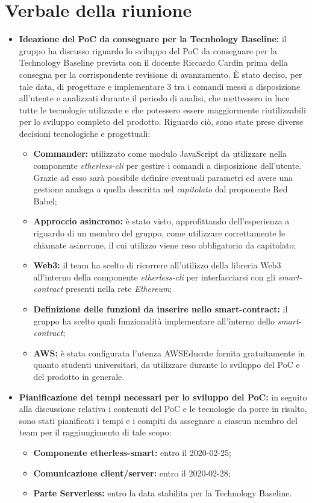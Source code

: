 \section{Verbale della riunione}
	\begin{itemize}
		\item \textbf{Ideazione del PoC da consegnare per la Tecnhology Baseline:} il gruppo ha discusso riguardo lo sviluppo del PoC da consegnare per la Technology Baseline prevista con il docente Riccardo Cardin prima della consegna per la corrispondente revisione di avanzamento. È stato deciso, per tale data, di progettare e implementare 3 tra i comandi messi a disposizione all'utente e analizzati durante il periodo di analisi, che mettessero in luce tutte le tecnologie utilizzate e che potessero essere maggiormente riutilizzabili per lo sviluppo completo del prodotto. Riguardo ciò, sono state prese diverse decisioni tecnologiche e progettuali:
		\begin{itemize}
			\item \textbf{Commander:} utilizzato come modulo JavaScript da utilizzare nella componente \textit{etherless-cli} per gestire i comandi a disposizione dell'utente. Grazie ad esso sarà possibile definire eventuali parametri ed avere una gestione analoga a quella descritta nel \textit{capitolato} dal proponente Red Babel;
			\item \textbf{Approccio asincrono:} è stato visto, approfittando dell'esperienza a riguardo di un membro del gruppo, come utilizzare correttamente le chiamate asincrone, il cui utilizzo viene reso obbligatorio da capitolato;
			\item \textbf{Web3:} il team ha scelto di ricorrere all'utilizzo della libreria Web3 all'interno della componente \textit{etherless-cli} per interfacciarsi con gli \textit{smart-contract\glo} presenti nella rete \textit{Ethereum\glos};
			\item \textbf{Definizione delle funzioni da inserire nello smart-contract:} il gruppo ha scelto quali funzionalità implementare all'interno dello \textit{smart-contract\glo};
			\item \textbf{AWS:} è stata configurata l'utenza AWSEducate fornita gratuitamente in quanto studenti universitari, da utilizzare durante lo sviluppo del PoC e del prodotto in generale.
		\end{itemize}
		
		\item \textbf{Pianificazione dei tempi necessari per lo sviluppo del PoC:} in seguito alla discussione relativa i contenuti del PoC e le tecnologie da porre in risalto, sono stati pianificati i tempi e i compiti da assegnare a ciascun membro del team per il raggiungimento di tale scopo:
		\begin{itemize}
			\item \textbf{Componente etherless-smart:} entro il 2020-02-25;
			\item \textbf{Comunicazione client/server:} entro il 2020-02-28;
			\item \textbf{Parte Serverless:} entro la data stabilita per la Technology Baseline.
		\end{itemize}
		

\end{itemize}
